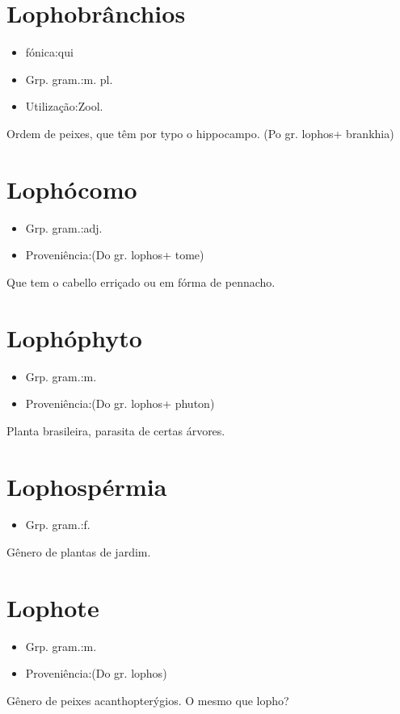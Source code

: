 \section{Lophobrânchios}
\begin{itemize}
\item {fónica:qui}
\end{itemize}
\begin{itemize}
\item {Grp. gram.:m. pl.}
\end{itemize}
\begin{itemize}
\item {Utilização:Zool.}
\end{itemize}
Ordem de peixes, que têm por typo o hippocampo.
(Po gr. \textunderscore lophos\textunderscore  + \textunderscore brankhia\textunderscore )
\section{Lophócomo}
\begin{itemize}
\item {Grp. gram.:adj.}
\end{itemize}
\begin{itemize}
\item {Proveniência:(Do gr. \textunderscore lophos\textunderscore  + \textunderscore tome\textunderscore )}
\end{itemize}
Que tem o cabello erriçado ou em fórma de pennacho.
\section{Lophóphyto}
\begin{itemize}
\item {Grp. gram.:m.}
\end{itemize}
\begin{itemize}
\item {Proveniência:(Do gr. \textunderscore lophos\textunderscore  + \textunderscore phuton\textunderscore )}
\end{itemize}
Planta brasileira, parasita de certas árvores.
\section{Lophospérmia}
\begin{itemize}
\item {Grp. gram.:f.}
\end{itemize}
Gênero de plantas de jardim.
\section{Lophote}
\begin{itemize}
\item {Grp. gram.:m.}
\end{itemize}
\begin{itemize}
\item {Proveniência:(Do gr. \textunderscore lophos\textunderscore )}
\end{itemize}
Gênero de peixes acanthopterýgios.
O mesmo que \textunderscore lopho\textunderscore ?
